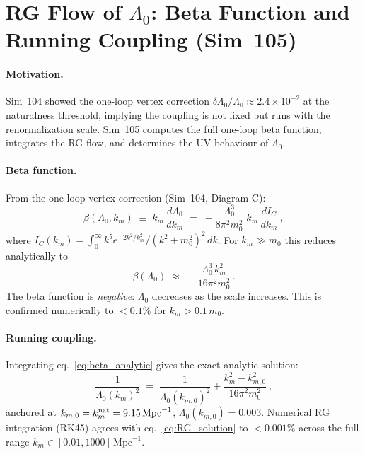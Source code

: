 \documentclass[12pt,a4paper]{article}
\begin{document}
\section{RG Flow of $\Lambda_0$: Beta Function and Running Coupling (Sim~105)}
\label{sec:sim105}

\paragraph{Motivation.}
Sim~104 showed the one-loop vertex correction
$\delta\Lambda_0/\Lambda_0 \approx 2.4\times10^{-2}$ at the naturalness
threshold, implying the coupling is not fixed but runs with the
renormalization scale.  Sim~105 computes the full one-loop beta function,
integrates the RG flow, and determines the UV behaviour of $\Lambda_0$.

\paragraph{Beta function.}
From the one-loop vertex correction (Sim~104, Diagram C):
\begin{equation}
\beta(\Lambda_0,k_m) \;\equiv\; k_m\,\frac{d\Lambda_0}{dk_m}
  \;=\; -\frac{\Lambda_0^3}{8\pi^2 m_0^2}\;k_m\,\frac{dI_C}{dk_m}\,,
\end{equation}
where $I_C(k_m)=\int_0^\infty k^5 e^{-2k^2/k_m^2}/(k^2+m_0^2)^2\,dk$.
For $k_m\gg m_0$ this reduces analytically to
\begin{equation}
\beta(\Lambda_0) \;\approx\; -\frac{\Lambda_0^3\,k_m^2}{16\pi^2 m_0^2}\,.
\label{eq:beta_analytic}
\end{equation}
The beta function is \emph{negative}: $\Lambda_0$ decreases as the scale
increases. This is confirmed numerically to $<0.1\%$ for $k_m>0.1\,m_0$.

\paragraph{Running coupling.}
Integrating eq.~\eqref{eq:beta_analytic} gives the exact analytic solution:
\begin{equation}
\frac{1}{\Lambda_0(k_m)^2} \;=\; \frac{1}{\Lambda_0(k_{m,0})^2}
  + \frac{k_m^2 - k_{m,0}^2}{16\pi^2 m_0^2}\,,
\label{eq:RG_solution}
\end{equation}
anchored at $k_{m,0}=k_m^{\rm nat}=9.15\,\mathrm{Mpc}^{-1}$,
$\Lambda_0(k_{m,0})=0.003$.
Numerical RG integration (RK45) agrees with eq.~\eqref{eq:RG_solution}
to $<0.001\%$ across the full range $k_m\in[0.01,1000]\,\mathrm{Mpc}^{-1}$.
\end{document}
